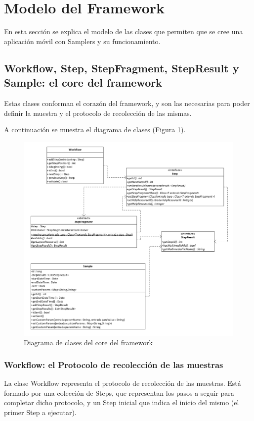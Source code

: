 \section{Modelo del Framework}
En esta sección se explica el modelo de las clases que permiten que se cree una aplicación móvil con Samplers y su funcionamiento.

\subsection{Workflow, Step, StepFragment, StepResult y Sample: el core del framework}
Estas clases conforman el corazón del framework, y son las necesarias para poder definir la muestra y el protocolo de recolección de las mismas.

A continuación se muestra el diagrama de clases (Figura \ref{fig:umlFrameworkCore}).

\begin{figure}[H]
  \centering
    \includegraphics[scale=0.4]{05-implementacion/FrameworkCore.png} 
   \caption{Diagrama de clases del core del framework}
   \label{fig:umlFrameworkCore}
\end{figure}


\subsubsection{Workflow: el Protocolo de recolección de las muestras}
La clase Workflow representa el protocolo de recolección de las muestras. Está formado por una colección de Steps, que representan los pasos a seguir para completar dicho protocolo, y un Step inicial que indica el inicio del mismo (el primer Step a ejecutar).

